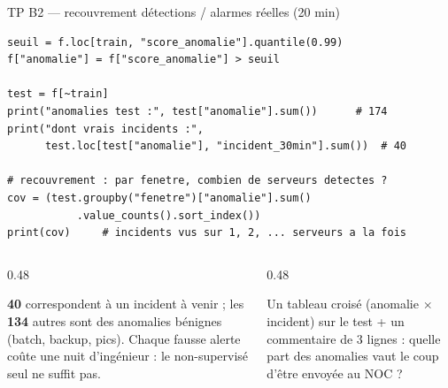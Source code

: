 \begin{frame}[fragile]{TP B2 --- recouvrement détections / alarmes réelles (20 min)}
\begin{codebox}
\begin{lstlisting}
seuil = f.loc[train, "score_anomalie"].quantile(0.99)
f["anomalie"] = f["score_anomalie"] > seuil

test = f[~train]
print("anomalies test :", test["anomalie"].sum())      # 174
print("dont vrais incidents :",
      test.loc[test["anomalie"], "incident_30min"].sum())  # 40

# recouvrement : par fenetre, combien de serveurs detectes ?
cov = (test.groupby("fenetre")["anomalie"].sum()
           .value_counts().sort_index())
print(cov)     # incidents vus sur 1, 2, ... serveurs a la fois
\end{lstlisting}
\end{codebox}
\begin{columns}[t]
\begin{column}{0.48\textwidth}
\begin{wbox}
\textbf{40} correspondent à un incident à venir ; les
\textbf{134} autres sont des anomalies bénignes (batch, backup,
pics). Chaque fausse alerte coûte une nuit d'ingénieur : le
non-supervisé seul ne suffit pas.
\end{wbox}
\end{column}
\begin{column}{0.48\textwidth}
\begin{ebox}[Livrable B2]
Un tableau croisé (anomalie $\times$ incident) sur le test + un
commentaire de 3 lignes : quelle part des anomalies vaut le coup
d'être envoyée au NOC ?
\end{ebox}
\end{column}
\end{columns}
\end{frame}

